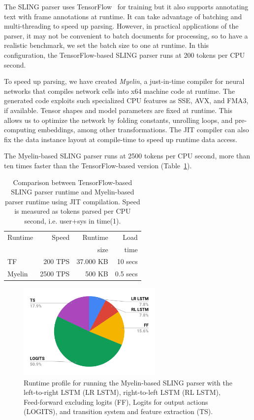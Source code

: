 \documentclass[11pt,a4paper]{article}
\begin{document}
The SLING parser uses TensorFlow~\cite{tensorflow} for training but it also
supports annotating text with frame annotations at runtime. It can take
advantage of batching and multi-threading to speed up parsing. However, in
practical applications of the parser, it may not be convenient to
batch documents for processing, so to have a realistic benchmark, we
set the batch size to one at runtime. In this configuration, the
TensorFlow-based SLING parser runs at 200 tokens per CPU second.

To speed up parsing, we have created \emph{Myelin}, a
just-in-time compiler for neural networks that compiles network cells into
x64 machine code at runtime. The generated code exploits such
specialized CPU features as SSE, AVX, and FMA3, if available.
Tensor shapes and model parameters are fixed at runtime.
This allows us to optimize the network by folding constants, unrolling
loops, and pre-computing embeddings, among other transformations. The JIT compiler can also fix the data
instance layout at compile-time to speed up runtime data access.

The Myelin-based SLING parser runs at 2500 tokens per CPU second, more
than ten times faster than the TensorFlow-based version
(Table~\ref{tab:runtime}).

\begin{table}[!t]
\centering
\begin{tabular}{|l|r|r|r|}
\hline
Runtime    & Speed     & Runtime      & Load      \\
           &           & size         & time      \\
\hline
TF         &  200 TPS  & 37.000 KB    & 10 secs   \\
Myelin     & 2500 TPS  &    500 KB    & 0.5 secs  \\
\hline
\end{tabular}
\caption{Comparison between TensorFlow-based SLING parser runtime and
Myelin-based parser runtime using JIT compilation.
Speed is measured as tokens parsed per CPU second, i.e. user+sys in time(1).}
\label{tab:runtime}
\end{table}

\begin{figure}[t]
  \centering
  \includegraphics[width = 200pt]{runtime.pdf}
  \caption{Runtime profile for running the Myelin-based SLING parser with the
  left-to-right LSTM (LR LSTM), right-to-left LSTM (RL LSTM), Feed-forward
  excluding logits (FF), Logits for output actions (LOGITS), and transition
  system and feature extraction (TS).}
  \label{fig:runtime}
\end{figure}
\end{document}
